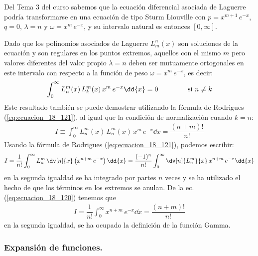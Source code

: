 Del Tema 3 del curso sabemos que la ecuación diferencial asociada de Laguerre podría transformarse en una ecuación de tipo Sturm Liouville con $p = x^{m+1} \, e^{-x}$, $q = 0$, $\lambda = n$ y $\omega = x^{m} \, e^{-x}$, y su intervalo natural es entonces $[0, \infty]$.
\par
Dado que los polinomios asociados de Laguerre $L_{m}^{n} (x)$ son soluciones de la ecuación y son regulares en los puntos extremos, aquellos con el mismo $m$ pero valores diferentes del valor propio $\lambda = n$ deben ser mutuamente ortogonales en este intervalo con respecto a la función de peso $\omega = x^{m} \, e^{-x}$, es decir:
\begin{align*}
\int_{0}^{\infty} L_{n}^{m} (x) \, L_{k}^{m} (x) \, x^{m} \, e^{-x} \dd{x} = 0 \hspace{1.5cm} \mbox{si } n \neq k
\end{align*}
Este resultado también se puede demostrar utilizando la fórmula de Rodrigues (\ref{eq:ecuacion_18_121}), al igual que la condición de normalización cuando $k = n$:
\begin{align}
I \equiv \int_{0}^{\infty} L_{n}^{m} (x) \, L_{n}^{m} (x) \, x^{m} \, e^{-x} \dd{x} =\dfrac{(n + m)!}{n!}
\label{eq:ecuacion_18_122}
\end{align}
Usando la fórmula de Rodrigues (\ref{eq:ecuacion_18_121}), podemos escribir:
\begin{align*}
I = \dfrac{1}{n!} \int_{0}^{\infty} L_{n}^{m} \, \dv[n]{x} \left( x^{n+m} \, e^{-x} \right) \dd{x} = \dfrac{(-1)^{n}}{n!} \int_{0}^{\infty} \dv[n]{L_{n}^{m}}{x} \, x^{n+m} \, e^{-x} \dd{x}
\end{align*}
en la segunda igualdad se ha integrado por partes $n$ veces y se ha utilizado el hecho de que los términos en los extremos se anulan. De la ec. (\ref{eq:ecuacion_18_120}) tenemos que 
\begin{align*}
I = \dfrac{1}{n!} \int_{0}^{\infty} x^{n+m} \, e^{-x} \dd{x} = \dfrac{(n + m)!}{n!}
\end{align*}
en la segunda igualdad, se ha ocupado la definición de la función Gamma.

\subsubsection{Expansión de funciones.}

